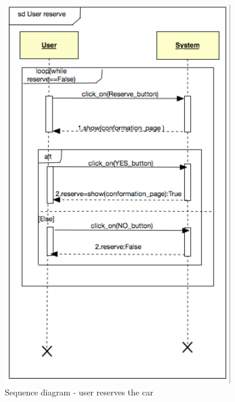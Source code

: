 \documentclass[12pt, letterpaper]{article}
\begin{document}
\begin{figure}[H]
\centering
\includegraphics[width=10cm]{userres.png}
\caption{Sequence diagram - user reserves the car}
\end{figure}
\end{document}
